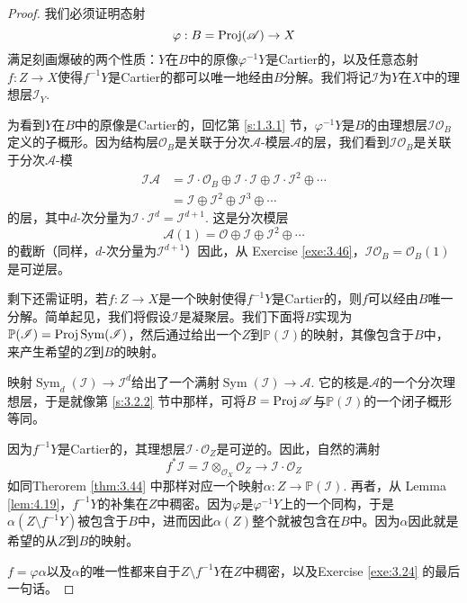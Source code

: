 \begin{proof}
	我们必须证明态射
\[
	\varphi:B=\operatorname{Proj}(\mathscr A)\to X
\]
满足刻画爆破的两个性质：$Y$在$B$中的原像$\varphi^{-1}Y$是Cartier的，以及任意态射$f:Z\to X$使得$f^{-1}Y$是Cartier的都可以唯一地经由$B$分解。我们将记$\mathscr I$为$Y$在$X$中的理想层$\mathscr I_Y$.

为看到$Y$在$B$中的原像是Cartier的，回忆第 \ref{s:1.3.1} 节，$\varphi^{-1}Y$是$B$的由理想层$\mathscr I\mathscr O_B$定义的子概形。因为结构层$\mathscr O_B$是关联于分次$\mathscr A$-模层$\mathscr A$的层，我们看到$\mathscr I\mathscr O_B$是关联于分次$\mathscr A$-模
\[
	\begin{aligned}
	\mathscr I\mathscr A&=\mathscr I\cdot \mathscr O_B\oplus \mathscr I\cdot \mathscr I\oplus \mathscr I\cdot \mathscr I^2 \oplus \cdots\\
	&=\mathscr I\oplus \mathscr I^2 \oplus \mathscr I^3\oplus \cdots
	\end{aligned}
\]
的层，其中$d$-次分量为$\mathscr I\cdot \mathscr I^d=\mathscr I^{d+1}$. 这是分次模层
\[
	\mathscr A(1)=\mathscr O\oplus \mathscr I \oplus \mathscr I^2\oplus \cdots
\]
的截断（同样，$d$-次分量为$\mathscr I^{d+1}$）因此，从 Exercise \ref{exe:3.46}，$\mathscr I\mathscr O_B=\mathscr O_B(1)$是可逆层。


剩下还需证明，若$f:Z\to X$是一个映射使得$f^{-1}Y$是Cartier的，则$f$可以经由$B$唯一分解。简单起见，我们将假设$\mathscr I$是凝聚层。我们下面将$B$实现为$\mathbb P(\mathscr I)=\operatorname{Proj} \operatorname{Sym}(\mathscr I)$，然后通过给出一个$Z$到$\mathbb P(\mathscr I)$的映射，其像包含于$B$中，来产生希望的$Z$到$B$的映射。

映射$\operatorname{Sym}_d(\mathscr I)\to \mathscr I^d$给出了一个满射$\operatorname{Sym}(\mathscr I)\to \mathscr A$. 它的核是$\mathscr A$的一个分次理想层，于是就像第 \ref{s:3.2.2} 节中那样，可将$B=\operatorname{Proj} \mathscr A$与$\mathbb P(\mathscr I)$的一个闭子概形等同。

因为$f^{-1}Y$是Cartier的，其理想层$\mathscr I\cdot \mathscr O_Z$是可逆的。因此，自然的满射
\[
	f^*\mathscr I=\mathscr I\otimes_{\mathscr O_X}\mathscr O_Z\to \mathscr I\cdot \mathscr O_Z
\]
如同Therorem \ref{thm:3.44} 中那样对应一个映射$\alpha:Z\to \mathbb P(\mathscr I)$. 再者，从 Lemma \ref{lem:4.19}，$f^{-1}Y$的补集在$Z$中稠密。因为$\varphi$是$\varphi^{-1}Y$上的一个同构，于是$\alpha(Z\setminus f^{-1}Y)$被包含于$B$中，进而因此$\alpha(Z)$整个就被包含在$B$中。因为$\alpha$因此就是希望的从$Z$到$B$的映射。

$f=\varphi\alpha$以及$\alpha$的唯一性都来自于$Z\setminus f^{-1}Y$在$Z$中稠密，以及Exercise \ref{exe:3.24} 的最后一句话。
\end{proof}

